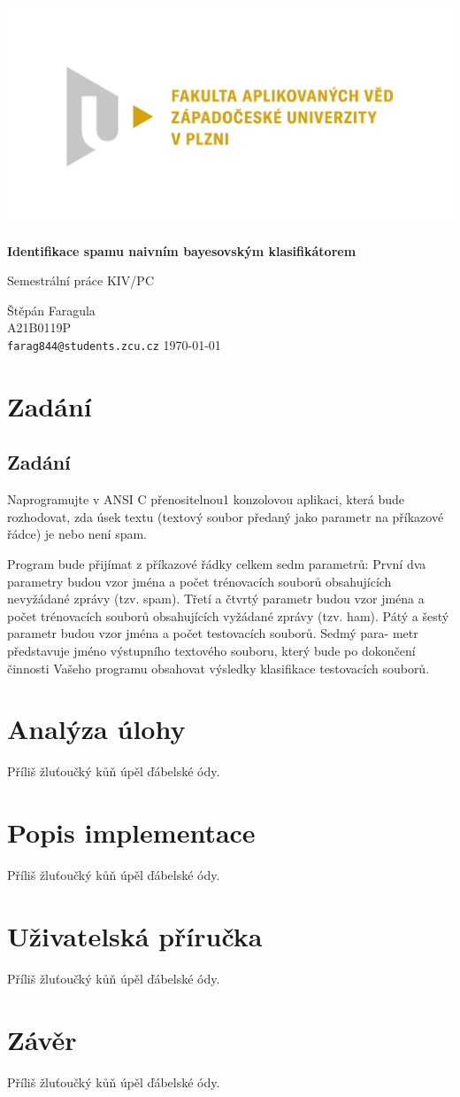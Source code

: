 \documentclass[12pt]{report}
\begin{document}
	
	\begin{titlepage}
		\centering
		\Large
		
		\includegraphics[width=.7\textwidth]{fav}
		
		\vspace{15mm}
		{\Huge\bfseries Identifikace spamu naivním bayesovským klasifikátorem}
		
		\vspace{15mm}
		{\LARGE Semestrální práce KIV/PC}
		
		\vfill
		\raggedright
		Štěpán Faragula\\
		A21B0119P\\
		\texttt{farag844@students.zcu.cz} 
		\hfill 
		\today
	\end{titlepage}
	
	\tableofcontents

	\chapter{Zadání}
	
	\section{Zadání}
	Naprogramujte v ANSI C přenositelnou1 konzolovou aplikaci, která bude rozhodovat, zda úsek textu (textový soubor předaný jako parametr na příkazové řádce) je nebo není spam.
	
	Program bude přijímat z příkazové řádky celkem sedm parametrů: První dva parametry budou vzor jména a počet trénovacích souborů obsahujících nevyžádané zprávy (tzv. spam). Třetí a čtvrtý parametr budou vzor jména a počet trénovacích souborů obsahujících vyžádané zprávy (tzv. ham). Pátý a šestý parametr budou vzor jména a počet testovacích souborů. Sedmý para- metr představuje jméno výstupního textového souboru, který bude po dokončení činnosti Vašeho	programu obsahovat výsledky klasifikace testovacích souborů.
	
	\chapter{Analýza úlohy}
	Příliš žluťoučký kůň úpěl ďábelské ódy.
	
	\chapter{Popis implementace}
	Příliš žluťoučký kůň úpěl ďábelské ódy.
	
	\chapter{Uživatelská příručka}
	Příliš žluťoučký kůň úpěl ďábelské ódy.
	
	\chapter{Závěr}
	Příliš žluťoučký kůň úpěl ďábelské ódy.
	
\end{document}
